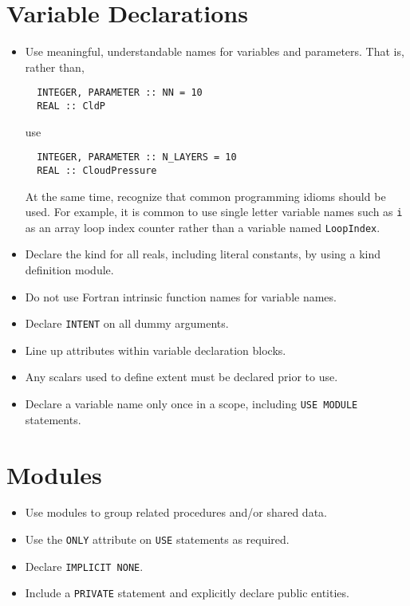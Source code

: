 \section{Variable Declarations}
\begin{itemize}
  \item Use meaningful, understandable names for variables and parameters. That is, rather than,
  \begin{verbatim}
  INTEGER, PARAMETER :: NN = 10
  REAL :: CldP\end{verbatim}
use
  \begin{verbatim}
  INTEGER, PARAMETER :: N_LAYERS = 10
  REAL :: CloudPressure\end{verbatim}
At the same time, recognize that common programming idioms should be used. For example, it is common to use single letter variable names such as \texttt{i} as an array loop index counter rather than a variable named \texttt{LoopIndex}.
  \item Declare the kind for all reals, including literal constants, by using a kind definition module.
  \item Do not use Fortran intrinsic function names for variable names.
  \item Declare \texttt{INTENT} on all dummy arguments.
  \item Line up attributes within variable declaration blocks.
  \item Any scalars used to define extent must be declared prior to use. 
  \item Declare a variable name only once in a scope, including \texttt{USE MODULE} statements. 
\end{itemize}


\section{Modules}
\begin{itemize}
  \item Use modules to group related procedures and/or shared data.
  \item Use the \texttt{ONLY} attribute on \texttt{USE} statements as required. 
  \item Declare \texttt{IMPLICIT NONE}.
  \item Include a \texttt{PRIVATE} statement and explicitly declare public entities.
\end{itemize}


